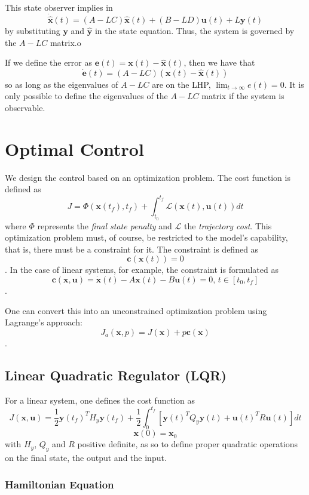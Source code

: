 \documentclass[a4paper]{report}
\begin{document}
This state observer implies in \[
    \bm{\dot{\hat{x}}}(t) = \left( A - LC \right) \bm{\hat{x}}(t) + \left( B-LD \right) \bm{u}(t) + L\bm{y}(t)
\] by substituting $\bm{y}$ and $\bm{\hat{y}}$ in the state equation. Thus, the system is governed by the $A-LC$ matrix.o

If we define the error as $\bm{e}(t) = \bm{x}(t) - \bm{\hat{x}}(t)$, then we have that \[
    \bm{\dot{e}}(t) = (A-LC)(\bm{x}(t) - \bm{\hat{x}}(t))
\] so as long as the eigenvalues of $A-LC$ are on the LHP, $\lim_{t \to \infty} e(t) = 0$. It is only possible to define the eigenvalues of the $A-LC$ matrix if the system is observable.

\section*{Optimal Control}

We design the control based on an optimization problem. The cost function is defined as \[
    J = \Phi\left( \bm{x}(t_f), t_f \right) + \int_{t_0}^{t_f}\mathcal{L}\left( \bm{x}(t), \bm{u}(t) \right) dt
\] where $\Phi$ represents the \emph{final state penalty} and $\mathcal{L}$ the \emph{trajectory cost}. This optimization problem must, of course, be restricted to the model's capability, that is, there must be a constraint for it. The constraint is defined as \[
\bm{c}(\bm{x}(t)) = 0
\]. In the case of linear systems, for example, the constraint is formulated as \[
\bm{c}(\bm{x}, \bm{u}) = \bm{\dot{x}}(t) - A\bm{x}(t) - B\bm{u}(t) = 0\text{, } t \in [t_0,t_f] 
\].

One can convert this into an unconstrained optimization problem using Lagrange's approach: \[
    J_a(\bm{x}, p) = J(\bm{x}) + p\bm{c}(\bm{x})
\].

\subsection*{Linear Quadratic Regulator (LQR)}

For a linear system, one defines the cost function as \[
    J(\bm{x}, \bm{u}) = \frac{1}{2}\bm{y}(t_f)^{T}H_y \bm{y}(t_f) + \frac{1}{2}\int_0^{t_f}\left[ \bm{y}(t)^{T}Q_y \bm{y}(t)  +  \bm{u}(t)^{T}R\bm{u}(t) \right] dt
\] \[
\bm{x}(0) = \bm{x}_0
\] with $H_y$, $Q_y$ and $R$ positive definite, as so to define proper quadratic operations on the final state, the output and the input.

\subsubsection*{Hamiltonian Equation}
\end{document}
